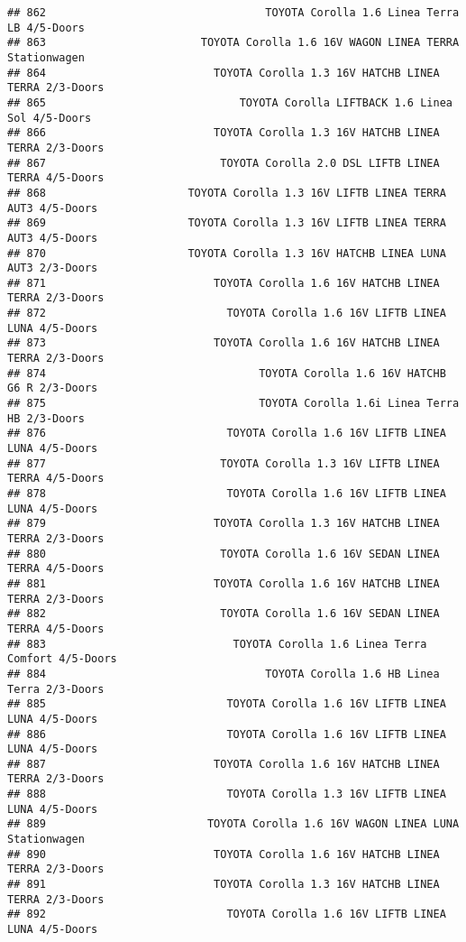 \documentclass[]{article}
\begin{document}
\begin{verbatim}
## 862                                  TOYOTA Corolla 1.6 Linea Terra LB 4/5-Doors
## 863                        TOYOTA Corolla 1.6 16V WAGON LINEA TERRA Stationwagen
## 864                          TOYOTA Corolla 1.3 16V HATCHB LINEA TERRA 2/3-Doors
## 865                              TOYOTA Corolla LIFTBACK 1.6 Linea Sol 4/5-Doors
## 866                          TOYOTA Corolla 1.3 16V HATCHB LINEA TERRA 2/3-Doors
## 867                           TOYOTA Corolla 2.0 DSL LIFTB LINEA TERRA 4/5-Doors
## 868                      TOYOTA Corolla 1.3 16V LIFTB LINEA TERRA AUT3 4/5-Doors
## 869                      TOYOTA Corolla 1.3 16V LIFTB LINEA TERRA AUT3 4/5-Doors
## 870                      TOYOTA Corolla 1.3 16V HATCHB LINEA LUNA AUT3 2/3-Doors
## 871                          TOYOTA Corolla 1.6 16V HATCHB LINEA TERRA 2/3-Doors
## 872                            TOYOTA Corolla 1.6 16V LIFTB LINEA LUNA 4/5-Doors
## 873                          TOYOTA Corolla 1.6 16V HATCHB LINEA TERRA 2/3-Doors
## 874                                 TOYOTA Corolla 1.6 16V HATCHB G6 R 2/3-Doors
## 875                                 TOYOTA Corolla 1.6i Linea Terra HB 2/3-Doors
## 876                            TOYOTA Corolla 1.6 16V LIFTB LINEA LUNA 4/5-Doors
## 877                           TOYOTA Corolla 1.3 16V LIFTB LINEA TERRA 4/5-Doors
## 878                            TOYOTA Corolla 1.6 16V LIFTB LINEA LUNA 4/5-Doors
## 879                          TOYOTA Corolla 1.3 16V HATCHB LINEA TERRA 2/3-Doors
## 880                           TOYOTA Corolla 1.6 16V SEDAN LINEA TERRA 4/5-Doors
## 881                          TOYOTA Corolla 1.6 16V HATCHB LINEA TERRA 2/3-Doors
## 882                           TOYOTA Corolla 1.6 16V SEDAN LINEA TERRA 4/5-Doors
## 883                             TOYOTA Corolla 1.6 Linea Terra Comfort 4/5-Doors
## 884                                  TOYOTA Corolla 1.6 HB Linea Terra 2/3-Doors
## 885                            TOYOTA Corolla 1.6 16V LIFTB LINEA LUNA 4/5-Doors
## 886                            TOYOTA Corolla 1.6 16V LIFTB LINEA LUNA 4/5-Doors
## 887                          TOYOTA Corolla 1.6 16V HATCHB LINEA TERRA 2/3-Doors
## 888                            TOYOTA Corolla 1.3 16V LIFTB LINEA LUNA 4/5-Doors
## 889                         TOYOTA Corolla 1.6 16V WAGON LINEA LUNA Stationwagen
## 890                          TOYOTA Corolla 1.6 16V HATCHB LINEA TERRA 2/3-Doors
## 891                          TOYOTA Corolla 1.3 16V HATCHB LINEA TERRA 2/3-Doors
## 892                            TOYOTA Corolla 1.6 16V LIFTB LINEA LUNA 4/5-Doors

\end{verbatim}
\end{document}

